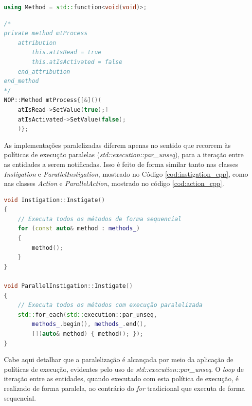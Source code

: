 \begin{lstlisting}[language=C++, float=htb,
caption = {Definição de \textit{Method} no \textit{Framework} PON C++ 4.0},
source = {Autoria própria},
label ={cod:method}]
  using Method = std::function<void(void)>;
\end{lstlisting}

\begin{lstlisting}[language=C++, float=htb,
caption = {Uso de \textit{Method} no \textit{Framework} PON C++ 4.0},
source = {Autoria própria},
label ={cod:method_ex}]
/*
private method mtProcess
    attribution
        this.atIsRead = true
        this.atIsActivated = false
    end_attribution
end_method
*/
NOP::Method mtProcess{[&]()(
    atIsRead->SetValue(true);]
    atIsActivated->SetValue(false);
    )};

\end{lstlisting}

As implementações paralelizadas diferem apenas no sentido que recorrem às
políticas de execução paralelas (\textit{std::execution::par\_unseq}), para a
iteração entre as entidades a serem notificadas. Isso é feito de forma similar
tanto nas classes \textit{Instigation} e \textit{ParallelInstigation}, mostrado
no Código \ref{cod:instigation_cpp}, como nas classes \textit{Action} e
\textit{ParallelAction}, mostrado no código \ref{cod:action_cpp}.

\begin{lstlisting}[language=C++, float=htb,
caption = {Detalhe de implementação
de paralelização da \textit{Instigation} no \textit{Framework} PON C++ 4.0},
source = {Autoria própria}, label = {cod:instigation_cpp}]
void Instigation::Instigate()
{
    // Executa todos os métodos de forma sequencial
    for (const auto& method : methods_)
    {
        method();
    }
}

void ParallelInstigation::Instigate()
{
    // Executa todos os métodos com execução paralelizada
    std::for_each(std::execution::par_unseq,
        methods_.begin(), methods_.end(),
        [](auto& method) { method(); });
}
\end{lstlisting}

Cabe aqui detalhar que a paralelização é alcançada por meio da aplicação de
políticas de execução, evidentes pelo uso de
\textit{std::execution::par\_unseq}. O \textit{loop} de iteração entre as
entidades, quando executado com esta política de execução, é realizado de forma
paralela, ao contrário do \textit{for} tradicional que executa de forma
sequencial.

